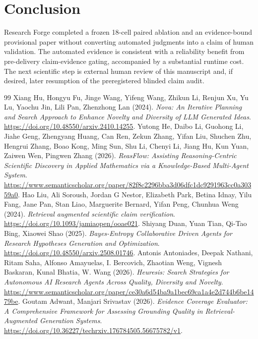 \documentclass[11pt]{article}
\begin{document}
\section{Conclusion}
Research Forge completed a frozen 18-cell paired ablation and an evidence-bound provisional paper without converting automated judgments into a claim of human validation. The automated evidence is consistent with a reliability benefit from pre-delivery claim-evidence gating, accompanied by a substantial runtime cost. The next scientific step is external human review of this manuscript and, if desired, later resumption of the preregistered blinded claim audit.

\begin{thebibliography}{99}
Xiang Hu, Hongyu Fu, Jinge Wang, Yifeng Wang, Zhikun Li, Renjun Xu, Yu Lu, Yaochu Jin, Lili Pan, Zhenzhong Lan (2024). \newblock \emph{Nova: An Iterative Planning and Search Approach to Enhance Novelty and Diversity of LLM Generated Ideas}. \newblock \url{https://doi.org/10.48550/arxiv.2410.14255}.
Yutong He, Daibo Li, Guohong Li, Jiahe Geng, Zhengyang Huang, Can Ren, Zekun Zhang, Yifan Liu, Shuchen Zhu, Hengrui Zhang, Boao Kong, Ming Sun, Shu Li, Chenyi Li, Jiang Hu, Kun Yuan, Zaiwen Wen, Pingwen Zhang (2026). \newblock \emph{ReasFlow: Assisting Reasoning-Centric Scientific Discovery in Applied Mathematics via a Knowledge-Based Multi-Agent System}. \newblock \url{https://www.semanticscholar.org/paper/82f8c2296bba3d06dfc1dc9291963cc0a30359a0}.
Hao Liu, Ali Soroush, Jordan G Nestor, Elizabeth Park, Betina Idnay, Yilu Fang, Jane Pan, Stan Liao, Marguerite Bernard, Yifan Peng, Chunhua Weng (2024). \newblock \emph{Retrieval augmented scientific claim verification}. \newblock \url{https://doi.org/10.1093/jamiaopen/ooae021}.
Shiyang Duan, Yuan Tian, Qi-Tao Bing, Xiaowei Shao (2025). \newblock \emph{Bayes-Entropy Collaborative Driven Agents for Research Hypotheses Generation and Optimization}. \newblock \url{https://doi.org/10.48550/arxiv.2508.01746}.
Antonis Antoniades, Deepak Nathani, Ritam Saha, Alfonso Amayuelas, I. Bercovich, Zhaotian Weng, Vignesh Baskaran, Kunal Bhatia, W. Wang (2026). \newblock \emph{Heuresis: Search Strategies for Autonomous AI Research Agents Across Quality, Diversity and Novelty}. \newblock \url{https://www.semanticscholar.org/paper/ce30a6d54ba9a1bec69ca1a4e2d744b6be1479be}.
Goutam Adwant, Manjari Srivastav (2026). \newblock \emph{Evidence Coverage Evaluator: A Comprehensive Framework for Assessing Grounding Quality in Retrieval-Augmented Generation Systems}. \newblock \url{https://doi.org/10.36227/techrxiv.176784505.56675782/v1}.

\end{thebibliography}
\end{document}
